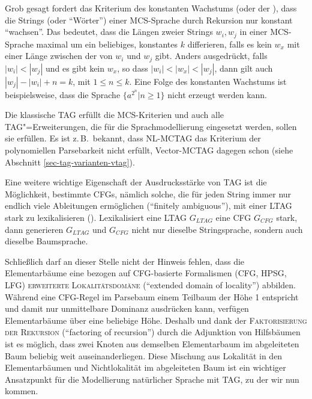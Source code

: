 Grob gesagt fordert das Kriterium des konstanten Wachstums (oder der ), dass die Strings (oder "`Wörter"') einer MCS-Sprache durch Rekursion nur konstant "`wachsen"'. Das bedeutet, dass die Längen zweier Strings $w_i, w_j$ in einer MCS-Sprache maximal um ein beliebiges, konstantes $k$ differieren, falls es kein $w_x$ mit einer Länge zwischen der von $w_i$ und $w_j$  gibt. Anders ausgedrückt, falls $|w_i| < |w_j|$ und es gibt kein $w_x$, so dass $|w_i| < |w_x| < |w_j|$, dann gilt auch $|w_j| - |w_i| + n = k$, mit $1 \leq n \leq k$. Eine Folge des konstanten Wachstums ist beispielsweise, dass die Sprache $\{a^{2^n} | n \geq 1\}$ nicht erzeugt werden kann.

Die klassische TAG erfüllt die MCS-Kriterien und auch alle TAG"=Erweiterungen, die für die Sprachmodellierung eingesetzt werden, sollen sie erfüllen. Es ist z.\,B.\ bekannt, dass NL-MCTAG das Kriterium der polynomiellen Parsebarkeit nicht erfüllt, Vector-MCTAG dagegen schon (siehe Abschnitt \ref{sec-tag-varianten-vtag}).    

Eine weitere wichtige Eigenschaft der Ausdrucksstärke von TAG ist die Möglichkeit, bestimmte CFGs, nämlich solche, die für jeden String immer nur endlich viele Ableitungen ermöglichen ("`finitely ambiguous"'), mit einer LTAG stark zu lexikalisieren (\citealt{Schabes:etal:88, Joshi:Schabes:91}). Lexikalisiert eine LTAG $G_{\mathit{LTAG}}$ eine CFG $G_{\mathit{CFG}}$ stark, dann generieren $G_{\mathit{LTAG}}$ und $G_{\mathit{CFG}}$ nicht nur dieselbe Stringsprache, sondern auch dieselbe Baumsprache.

Schlie\ss lich darf an dieser Stelle nicht der Hinweis fehlen, dass die Elementarbäume eine bezogen auf CFG-basierte Formalismen (CFG, HPSG, LFG) \textsc{erweiterte Lokalitätsdomäne} ("`extended domain of locality"') abbilden. Während eine CFG-Regel im Parsebaum einem Teilbaum der Höhe 1 entspricht und damit nur unmittelbare Dominanz ausdrücken kann, verfügen Elementarbäume über eine beliebige Höhe. Deshalb und dank der \textsc{Faktorisierung der Rekursion} ("`factoring of recursion"') durch die Adjunktion von Hilfsbäumen ist es möglich, dass zwei Knoten aus demselben Elementarbaum im abgeleiteten Baum beliebig weit auseinanderliegen. Diese Mischung aus Lokalität in den Elementarbäumen und Nichtlokalität im abgeleiteten Baum ist ein wichtiger Ansatzpunkt für die Modellierung natürlicher Sprache mit TAG, zu der wir nun kommen. 


